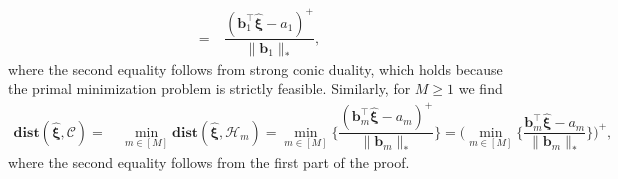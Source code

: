 \documentclass[nonblindrev]{informs2017}
\newcommand{\bmh}[1]{\hat{\bm{#1}}}
\newcommand{\1}[1]{\mathds{1}{\left(#1\right)}}
\begin{document}
\begin{appendices}
\begin{align*}
=~ & \dfrac{(\bm{b}^\top_1\bmh{\xi} - a_1)^+}{\|\bm{b}_1\|_*},
\end{align*}
where the second equality follows from strong conic duality, which holds because the primal minimization problem is strictly feasible. Similarly, for $M\ge 1$ we find
\begin{align*}
\mathbf{dist}(\bmh{\xi}, \mathcal{C}) =~& \min_{m \in [M]} \mathbf{dist}(\bmh{\xi}, \mathcal{H}_m)= \min_{m \in [M]} \bigg\{\dfrac{(\bm{b}^\top_m\bmh{\xi} - a_m)^+}{\|\bm{b}_m\|_*}\bigg\} = \bigg(\min_{m \in [M]} \bigg\{\dfrac{\bm{b}^\top_m\bmh{\xi} - a_m}{\|\bm{b}_m\|_*}\bigg\}\bigg)^+,
\end{align*}
where the second equality follows from the first part of the proof. 
\hfill \Halmos
\endproof


\end{appendices}
\end{document}
